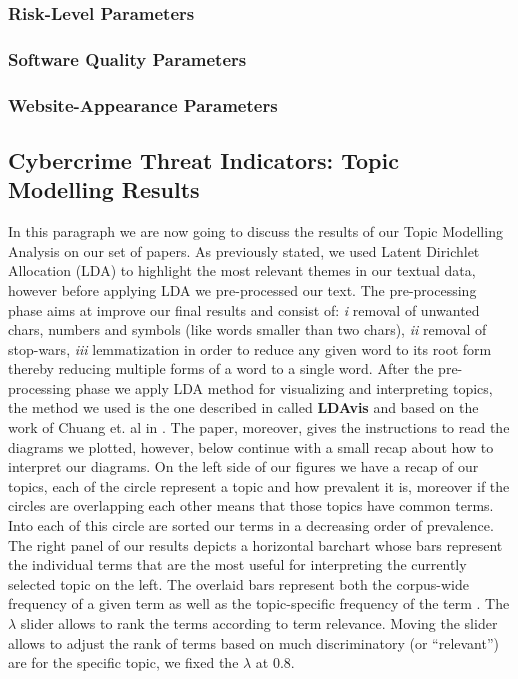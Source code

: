 \subsubsection{Risk-Level Parameters}

\subsubsection{Software Quality Parameters}

\subsubsection{Website-Appearance Parameters}



\subsection{Cybercrime Threat Indicators: Topic Modelling Results}

In this paragraph we are now going to discuss the results of our Topic Modelling Analysis on our set of papers. As previously stated, we used Latent Dirichlet Allocation (LDA) to highlight the most relevant themes in our textual data, however before applying LDA we pre-processed our text. The pre-processing phase aims at improve our final results and consist of: \emph{i} removal of unwanted chars, numbers and symbols (like words smaller than two chars), \emph{ii} removal of stop-wars, \emph{iii} lemmatization in order to reduce any given word to its root form thereby reducing multiple forms of a word to a single word.
After the pre-processing phase we apply LDA method for visualizing and interpreting topics, the method we used is the one described in \cite{W14-3110} called \textbf{LDAvis} and based on the work of Chuang et. al in \cite{Chuang:2012:TVT:2254556.2254572}. The paper, moreover, gives the instructions to read the diagrams we plotted, however, below continue with a small recap about how to interpret our diagrams. 
On the left side of our figures we have a recap of our topics, each of the circle represent a topic and how prevalent it is, moreover if the circles are overlapping each other means that those topics have common terms. Into each of this circle are sorted our terms in a decreasing order of prevalence.
The right panel of our results depicts a horizontal barchart whose bars represent the individual terms that are the most useful for interpreting the currently selected topic on the left. The overlaid bars represent both the corpus-wide frequency of a given term as well as the topic-specific frequency of the term \cite{W14-3110, Chuang:2012:TVT:2254556.2254572}. The $\lambda$ slider allows to rank the terms according to term relevance. Moving the slider allows to adjust the rank of terms based on much discriminatory (or ``relevant'') are for the specific topic, we fixed the $\lambda$ at 0.8.

